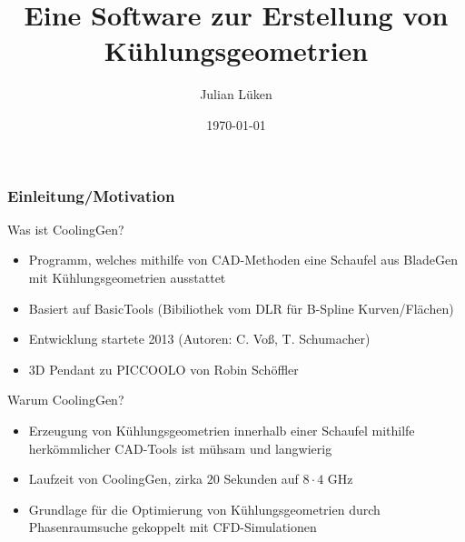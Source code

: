 \documentclass[8pt, aspectratio=169]{beamer}
\title[CoolingGen]{Eine Software zur Erstellung von Kühlungsgeometrien}
\author{Julian Lüken}
\date{\today}
\begin{document}
\begin{frame}[plain]
	\maketitle
\end{frame}

\begin{frame}
	\frametitle{Einleitung/Motivation}
	\vspace{-1cm}\hspace{-0.5cm}
	\begin{minipage}[t]{\textwidth}
		Was ist CoolingGen?
		\begin{itemize}
			\item Programm, welches mithilfe von CAD-Methoden eine Schaufel aus BladeGen mit Kühlungsgeometrien ausstattet
			\item Basiert auf BasicTools (Bibiliothek vom DLR für B-Spline Kurven/Flächen)
			\item Entwicklung startete 2013 (Autoren: C. Voß, T. Schumacher)
			\item 3D Pendant zu PICCOOLO von Robin Schöffler
		\end{itemize}
		\vspace{0.5cm}
		Warum CoolingGen?
		\begin{itemize}
			\item Erzeugung von Kühlungsgeometrien innerhalb einer Schaufel mithilfe herkömmlicher CAD-Tools ist mühsam und langwierig
			\item Laufzeit von CoolingGen, zirka $20$ Sekunden auf $8 \cdot 4$ GHz
			\item Grundlage für die Optimierung von Kühlungsgeometrien durch Phasenraumsuche gekoppelt mit CFD-Simulationen
		\end{itemize}

	\end{minipage}
	\vfill
\end{frame}
\end{document}
